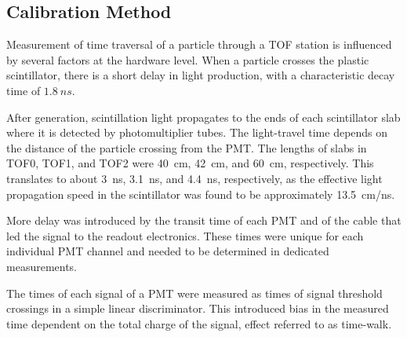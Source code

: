 
\subsection{Calibration Method}

Measurement of time traversal of a particle through a TOF station is
influenced by several factors at the hardware level. When a particle
crosses the plastic scintillator, there is a short delay in light
production, with a characteristic decay time of $1.8~ns$.

After generation, scintillation light propagates to the ends of each
scintillator slab where it is detected by photomultiplier tubes. The
light-travel time depends on the distance of the particle crossing
from the PMT. The lengths of slabs in TOF0, TOF1, and TOF2 were 40~cm,
42~cm, and 60~cm, respectively. This translates to about 3~ns, 3.1~ns,
and 4.4~ns, respectively, as the effective light propagation speed in
the scintillator was found to be approximately 13.5~cm/ns.

More delay was introduced by the transit time of each PMT and of the
cable that led the signal to the readout electronics. These times were
unique for each individual PMT channel and needed to be determined in
dedicated measurements.

The times of each signal of a PMT were measured as times of signal threshold
crossings in a simple linear discriminator. This introduced bias in
the measured time dependent on the total charge of the signal, effect
referred to as time-walk.

